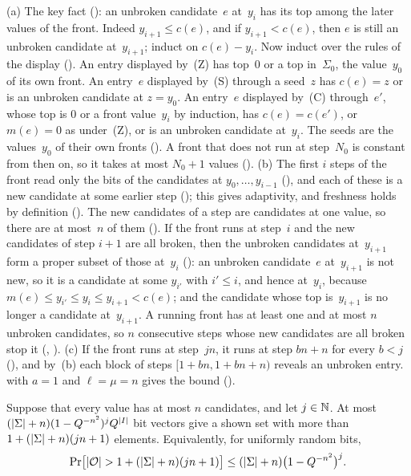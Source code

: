 \begin{outline}
(a) The key fact (): an unbroken candidate~$e$ at~$y_i$ has its top among the later values of the front.
Indeed $y_{i+1}\le c(e)$, and if $y_{i+1}<c(e)$, then $e$ is still an unbroken candidate at~$y_{i+1}$; induct on $c(e)-y_i$. Now
induct over the rules of the display (). An entry displayed by~(Z) has top~$0$ or a top in~$\Sigma_0$, the
value~$y_0$ of its own front. An entry~$e$ displayed by~(S) through a seed~$z$ has $c(e)=z$ or is an unbroken candidate at
$z=y_0$. An entry~$e$ displayed by~(C) through~$e'$, whose top is $0$ or a front value~$y_i$ by induction, has $c(e)=c(e')$,
or $m(e)=0$ as under~(Z), or is an unbroken candidate at~$y_i$. The seeds are the values~$y_0$ of their own fronts
(). A front that does not run at step~$N_0$ is constant from then on, so it takes at most $N_0+1$ values
().
(b) The first $i$ steps of the front read only the bits of the candidates at $y_0,\dots,y_{i-1}$ (), and each of
these is a new candidate at some earlier step (); this gives adaptivity, and freshness holds by
definition (). The new candidates of a step are candidates at one value, so there are at most~$n$ of
them (). If the front runs at step~$i$ and the new candidates of step $i+1$ are all broken, then the unbroken
candidates at~$y_{i+1}$ form a proper subset of those at~$y_i$ (): an unbroken candidate~$e$ at~$y_{i+1}$
is not new, so it is a candidate at some $y_{i'}$ with $i'\le i$, and hence at~$y_i$, because $m(e)\le y_{i'}\le y_i\le
y_{i+1}<c(e)$; and the candidate whose top is~$y_{i+1}$ is no longer a candidate at~$y_{i+1}$. A running front has at least one and
at most $n$ unbroken candidates, so $n$ consecutive steps whose new candidates are all broken stop it (,
).
(c) If the front runs at step~$jn$, it runs at step $bn+n$ for every $b<j$ (), and by~(b) each block of steps
$[1+bn,1+bn+n)$ reveals an unbroken entry.  with $a=1$ and $\ell=\mu=n$ gives the bound
().
\end{outline}

\begin{lemma}\label{lem:D}
Suppose that every value has at most $n$ candidates, and let $j\in\mathbb{N}$. At most $(\lvert \Sigma \rvert+n)(1-Q^{-n^2})^jQ^{\lvert I \rvert}$ bit
vectors give a shown set with more than $1+(\lvert \Sigma \rvert+n)(jn+1)$ elements. Equivalently, for uniformly random bits,
\[
  \Pr\bigl[\lvert \mathcal{O} \rvert>1+(\lvert \Sigma \rvert+n)(jn+1)\bigr]\le(\lvert \Sigma \rvert+n)\bigl(1-Q^{-n^2}\bigr)^j .
\]
\end{lemma}

